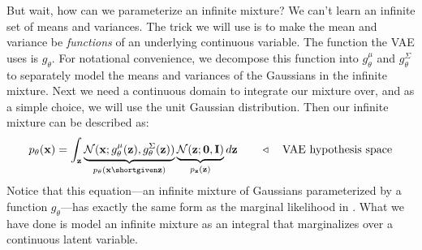 But wait, how can we parameterize an infinite mixture? We can't learn an infinite set of means and variances. The trick we will use is to make the mean and variance be \textit{functions} of an underlying continuous variable. The function the VAE uses is $g_{\theta}$. For notational convenience, we decompose this function into $g_{\theta}^{\mu}$ and $g_{\theta}^{\Sigma}$ to separately model the means and variances of the Gaussians in the infinite mixture. Next we need a continuous domain to integrate our mixture over, and as a simple choice, we will use the unit Gaussian distribution. Then our infinite mixture can be described as:
\begin{align}
    p_{\theta}(\mathbf{x}) = \int_{\mathbf{z}} \underbrace{\mathcal{N}(\mathbf{x}; g^{\mu}_{\theta}(\mathbf{z}), g^{\Sigma}_{\theta}(\mathbf{z}))}_{p_{\theta}(\mathbf{x} \shortgiven \mathbf{z})}\underbrace{\mathcal{N}(\mathbf{z}; \mathbf{0}, \mathbf{I})}_{p_{\mathbf{z}}(\mathbf{z})}d\mathbf{z} \quad\quad \triangleleft \quad\text{VAE hypothesis space}
\end{align}
Notice that this equation—an infinite mixture of Gaussians parameterized by a function $g_{\theta}$—has exactly the same form as the marginal likelihood in \eqn{\ref{eqn:generative_modeling_and_representation_learning:marginal_likelihood_p}}. What we have done is model an infinite mixture as an integral that marginalizes over a continuous latent variable.

